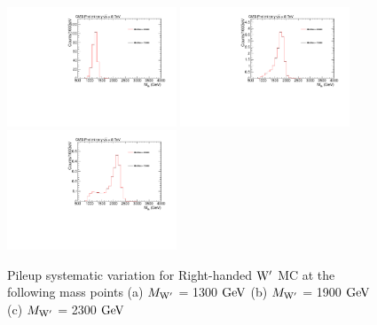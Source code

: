 \begin{figure}[htcb]
\begin{center}
\includegraphics[width=0.45\textwidth]{AN-13-004/figs/Signal_M1300_PileupReweighting}
\includegraphics[width=0.45\textwidth]{AN-13-004/figs/Signal_M1900_PileupReweighting}
\includegraphics[width=0.45\textwidth]{AN-13-004/figs/Signal_M2300_PileupReweighting}
\caption{
Pileup systematic variation for Right-handed $\mathrm{W}^\prime$ MC at the following mass points
(a) $M_{\mathrm{W}^\prime}$ = 1300$~\mathrm{GeV}$ 
(b) $M_{\mathrm{W}^\prime}$ = 1900$~\mathrm{GeV}$
(c) $M_{\mathrm{W}^\prime}$ = 2300$~\mathrm{GeV}$ 
}
\label{figs:signalPU}
\end{center}
\end{figure}


